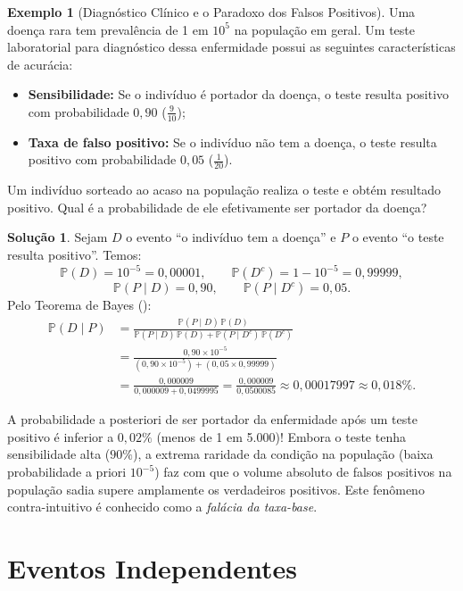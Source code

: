 \documentclass[12pt,portuguese]{article}
\theoremstyle{definition}
\newtheorem{example}[example]{Exemplo}
\newtheorem*{solution}{Solução}
\begin{document}
\begin{example}[Diagnóstico Clínico e o Paradoxo dos Falsos Positivos]\label{ex:falsos-positivos}
Uma doença rara tem prevalência de 1 em \(10^5\) na população em geral. Um teste laboratorial para diagnóstico dessa enfermidade possui as seguintes características de acurácia:
\begin{itemize}
  \item \textbf{Sensibilidade:} Se o indivíduo é portador da doença, o teste resulta positivo com probabilidade \(0{,}90\) (\(\tfrac{9}{10}\));
  \item \textbf{Taxa de falso positivo:} Se o indivíduo não tem a doença, o teste resulta positivo com probabilidade \(0{,}05\) (\(\tfrac{1}{20}\)).
\end{itemize}
Um indivíduo sorteado ao acaso na população realiza o teste e obtém resultado positivo. Qual é a probabilidade de ele efetivamente ser portador da doença?

\begin{solution}
Sejam \(D\) o evento ``o indivíduo tem a doença'' e \(P\) o evento ``o teste resulta positivo''. Temos:
\[
  \mathbb{P}(D) = 10^{-5} = 0{,}00001, \qquad \mathbb{P}(D^c) = 1 - 10^{-5} = 0{,}99999,
\]
\[
  \mathbb{P}(P \mid D) = 0{,}90, \qquad \mathbb{P}(P \mid D^c) = 0{,}05.
\]
Pelo Teorema de Bayes ():
\[
  \begin{aligned}
    \mathbb{P}(D \mid P) &= \frac{\mathbb{P}(P \mid D)\,\mathbb{P}(D)}{\mathbb{P}(P \mid D)\,\mathbb{P}(D) + \mathbb{P}(P \mid D^c)\,\mathbb{P}(D^c)} \\
    &= \frac{0{,}90 \times 10^{-5}}{(0{,}90 \times 10^{-5}) + (0{,}05 \times 0{,}99999)} \\
    &= \frac{0{,}000009}{0{,}000009 + 0{,}0499995} = \frac{0{,}000009}{0{,}0500085} \approx 0{,}00017997 \approx 0{,}018\%.
  \end{aligned}
\]
\end{solution}

A probabilidade a posteriori de ser portador da enfermidade após um teste positivo é inferior a \(0{,}02\%\) (menos de 1 em 5.000)! Embora o teste tenha sensibilidade alta (\(90\%\)), a extrema raridade da condição na população (baixa probabilidade a priori \(10^{-5}\)) faz com que o volume absoluto de falsos positivos na população sadia supere amplamente os verdadeiros positivos. Este fenômeno contra-intuitivo é conhecido como a \emph{falácia da taxa-base}.
\end{example}

\section{Eventos Independentes}
\label{sec:independencia}
\end{document}
